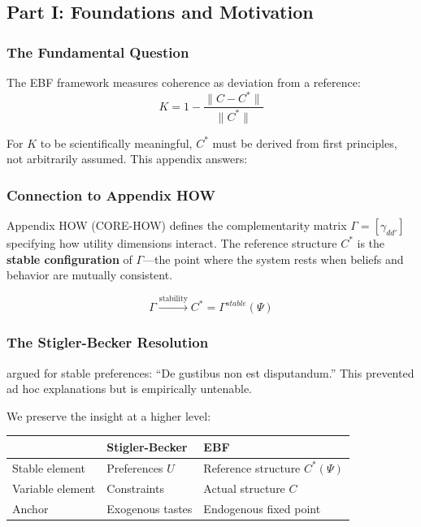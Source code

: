 \subsection{Part I: Foundations and Motivation}
\label{sec:D-foundations}

\subsubsection{The Fundamental Question}

The EBF framework measures coherence as deviation from a reference:
\begin{equation}
K = 1 - \frac{\|C - C^*\|}{\|C^*\|}
\end{equation}

For $K$ to be scientifically meaningful, $C^*$ must be derived from first
principles, not arbitrarily assumed. This appendix answers:

\begin{center}
\end{center}

\subsubsection{Connection to Appendix HOW}

Appendix HOW (CORE-HOW) defines the complementarity matrix $\Gamma = [\gamma_{dd'}]$
specifying how utility dimensions interact. The reference structure $C^*$ is
the \textbf{stable configuration} of $\Gamma$---the point where the system rests
when beliefs and behavior are mutually consistent.

\begin{equation}
\Gamma \xrightarrow{\text{stability}} C^* = \Gamma^{stable}(\Psi)
\end{equation}

\subsubsection{The Stigler-Becker Resolution}

\citet{stiglerbecker1977} argued for stable preferences: ``De gustibus non est
disputandum.'' This prevented ad hoc explanations but is empirically untenable.

We preserve the insight at a higher level:

\begin{center}
\renewcommand{\arraystretch}{1.3}
\begin{tabular}{lll}
\hline
& \textbf{Stigler-Becker} & \textbf{EBF} \\
\hline
Stable element & Preferences $U$ & Reference structure $C^*(\Psi)$ \\
Variable element & Constraints & Actual structure $C$ \\
Anchor & Exogenous tastes & Endogenous fixed point \\
\hline
\end{tabular}
\end{center}


